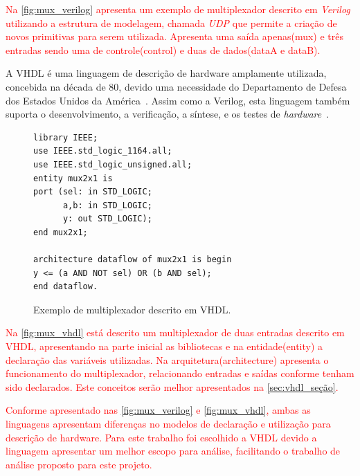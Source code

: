 \par
\textcolor{red}{Na \autoref{fig:mux_verilog} apresenta um exemplo de multiplexador descrito em \textit{Verilog} utilizando a estrutura de modelagem, chamada \textit{UDP} que permite a criação de novos primitivas para serem utilizada. Apresenta uma saída apenas(mux) e três entradas sendo uma de controle(control) e duas de dados(dataA e dataB).}

\par
A VHDL é uma linguagem de descrição de hardware amplamente utilizada, concebida na década de 80, devido uma necessidade do Departamento de Defesa dos Estados Unidos da América~\cite{cappelattipraticando}. Assim como a Verilog, esta linguagem também suporta o desenvolvimento, a verificação, a síntese, e os testes de \textit{hardware}~\cite{IEEEVHDLLanguage}.

\begin{figure}[H]
\caption{\label{fig:mux_vhdl} Exemplo de multiplexador descrito em VHDL.}
	\begin{center}
    \begin{minipage}{0.6\textwidth}
    \begin{lstlisting}       
library IEEE;
use IEEE.std_logic_1164.all;
use IEEE.std_logic_unsigned.all;
entity mux2x1 is
port (sel: in STD_LOGIC;
      a,b: in STD_LOGIC;
      y: out STD_LOGIC);
end mux2x1;

architecture dataflow of mux2x1 is begin
y <= (a AND NOT sel) OR (b AND sel);
end dataflow.
\end{lstlisting}
    \end{minipage}
	\end{center}
\end{figure}

\par
\textcolor{red}{Na \autoref{fig:mux_vhdl} está descrito um multiplexador de duas entradas descrito em VHDL, apresentando na parte inicial as bibliotecas e na entidade(entity) a declaração das variáveis utilizadas. Na arquitetura(architecture) apresenta o funcionamento do multiplexador, relacionando entradas e saídas conforme tenham sido declarados. Este conceitos serão melhor apresentados na \autoref{sec:vhdl_seção}.}

\par
\textcolor{red}{Conforme apresentado nas \autoref{fig:mux_verilog} e \autoref{fig:mux_vhdl}, ambas as linguagens apresentam diferenças no modelos de declaração e utilização para descrição de hardware. Para este trabalho foi escolhido a VHDL devido a linguagem apresentar um melhor escopo para análise, facilitando o trabalho de análise proposto para este projeto.}


